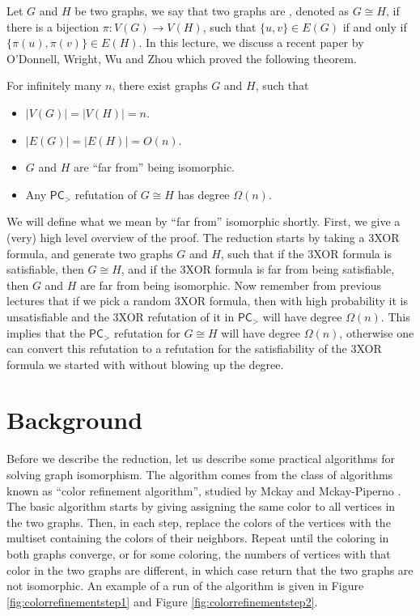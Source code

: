 \documentclass[a4paper,twoside,justified]{tufte-handout}
\begin{document}
 

Let $G$ and $H$ be two graphs, we say that two graphs are ,
denoted as $G \cong H$,
if there is a bijection $\pi: V(G) \to V(H)$, such that $\{u,v\} \in E(G)$
if and only if $\{\pi(u),\pi(v)\} \in E(H)$. In this lecture, we discuss
a recent paper by O'Donnell, Wright, Wu and Zhou \cite{robustgraphiso}
which proved the following theorem.

\begin{theorem}\label{thm:main}
  For infinitely many $n$, there exist graphs $G$ and $H$, such that
  \begin{itemize}
    \item $|V(G)|=|V(H)|=n$.
    \item $|E(G)|=|E(H)|=O(n)$.
    \item $G$ and $H$ are ``far from'' being isomorphic.
    \item Any $\mathsf{PC}_{>}$ refutation of $G \cong H$ has degree $\Omega(n)$.
  \end{itemize}
\end{theorem}

We will define what we mean by ``far from'' isomorphic shortly. First, we give a (very) high level
overview of the proof. The reduction starts by taking a 3XOR formula, and generate two graphs $G$ and $H$, such
that if the 3XOR formula is satisfiable, then $G \cong H$, and if the 3XOR formula is far from being satisfiable,
then $G$ and $H$ are far from being isomorphic. Now remember from previous lectures that if we pick a random 3XOR formula,
then with high probability it is unsatisfiable and the 3XOR refutation of it in $\mathsf{PC}_{>}$ will have degree $\Omega(n)$.
This implies that the $\mathsf{PC}_{>}$ refutation for $G \cong H$ will have degree $\Omega(n)$, otherwise one
can convert this refutation to a refutation for the satisfiability of the 3XOR formula we started with without blowing up the degree.

\section{Background}
Before we describe the reduction, let us describe some practical algorithms for solving graph isomorphism. 
The algorithm comes from the class of algorithms known as ``color refinement algorithm'', studied by Mckay and Mckay-Piperno \cite{mckay,mckay14}.
The basic algorithm starts by giving assigning the same color to all vertices in the two graphs. 
Then, in each step, replace the colors of the vertices with the multiset containing the colors of their neighbors.
Repeat until the coloring in both graphs converge, or for some coloring, the numbers of vertices with that color
in the two graphs are different, in which case return that the two graphs are not isomorphic.
An example of a run of the algorithm is given in Figure \ref{fig:colorrefinementstep1} and Figure
\ref{fig:colorrefinementstep2}.
\end{document}
